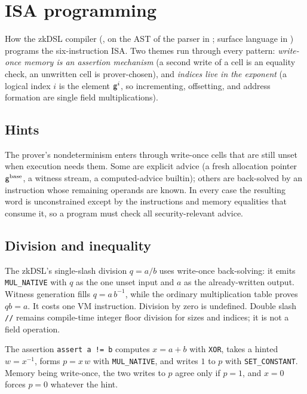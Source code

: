 \section{ISA programming}\label{sec:isa-programming}

How the zkDSL compiler (, on the AST of the parser in ; surface language in ) programs the six-instruction ISA. Two themes run through every pattern: \emph{write-once memory is an assertion mechanism} (a second write of a cell is an equality check, an unwritten cell is prover-chosen), and \emph{indices live in the exponent} (a logical index $i$ is the element $\mathsf{g}^{i}$, so incrementing, offsetting, and address formation are single field multiplications).

\subsection{Hints}\label{sec:prog-hints}

The prover's nondeterminism enters through write-once cells that are still unset when execution needs them. Some are explicit advice (a fresh allocation pointer $\mathsf{g}^{\mathrm{base}}$, a witness stream, a computed-advice builtin); others are back-solved by an instruction whose remaining operands are known. In every case the resulting word is unconstrained except by the instructions and memory equalities that consume it, so a program must check all security-relevant advice.

\subsection{Division and inequality}\label{sec:prog-div-ne}

The zkDSL's single-slash division $q=a/b$ uses write-once back-solving: it emits \texttt{MUL\_NATIVE} with $q$ as the one unset input and $a$ as the already-written output. Witness generation fills $q=a\,b^{-1}$, while the ordinary multiplication table proves $q b=a$. It costs one VM instruction. Division by zero is undefined. Double slash \texttt{//} remains compile-time integer floor division for sizes and indices; it is not a field operation.

The assertion \texttt{assert a != b} computes $x=a+b$ with \texttt{XOR}, takes a hinted $w=x^{-1}$, forms $p=x\,w$ with \texttt{MUL\_NATIVE}, and writes $1$ to $p$ with \texttt{SET\_CONSTANT}. Memory being write-once, the two writes to $p$ agree only if $p=1$, and $x=0$ forces $p=0$ whatever the hint.

